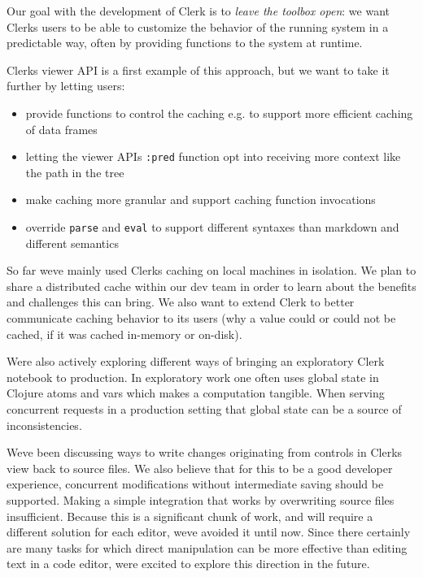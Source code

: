 \documentclass[sigconf,screen]{acmart}
\newcommand{\passthrough}[1]{#1}
\providecommand{\tightlist}{%
  \setlength{\itemsep}{0pt}\setlength{\parskip}{0pt}}
\begin{document}
Our goal with the development of Clerk is to \emph{leave the toolbox open}: we want Clerk\textquotesingle s users to be able to customize the behavior of the running system in a predictable way, often by providing functions to the system at runtime.

Clerk\textquotesingle s viewer API is a first example of this approach, but we want to take it further by letting users:

\begin{itemize}
\tightlist
\item
  provide functions to control the caching e.g. to support more efficient caching of data frames
\item
  letting the viewer API\textquotesingle s \passthrough{\lstinline!:pred!} function opt into receiving more context like the path in the tree
\item
  make caching more granular and support caching function invocations
\item
  override \passthrough{\lstinline!parse!} and \passthrough{\lstinline!eval!} to support different syntaxes than markdown and different semantics
\end{itemize}

So far we\textquotesingle ve mainly used Clerk\textquotesingle s caching on local machines in isolation. We plan to share a distributed cache within our dev team in order to learn about the benefits and challenges this can bring. We also want to extend Clerk to better communicate caching behavior to its users (why a value could or could not be cached, if it was cached in-memory or on-disk).

We\textquotesingle re also actively exploring different ways of bringing an exploratory Clerk notebook to production. In exploratory work one often uses global state in Clojure atoms and vars which makes a computation tangible. When serving concurrent requests in a production setting that global state can be a source of inconsistencies.

We\textquotesingle ve been discussing ways to write changes originating from controls in Clerk\textquotesingle s view back to source files. We also believe that for this to be a good developer experience, concurrent modifications without intermediate saving should be supported. Making a simple integration that works by overwriting source files insufficient. Because this is a significant chunk of work, and will require a different solution for each editor, we\textquotesingle ve avoided it until now. Since there certainly are many tasks for which direct manipulation can be more effective than editing text in a code editor, we\textquotesingle re excited to explore this direction in the future.
\end{document}
